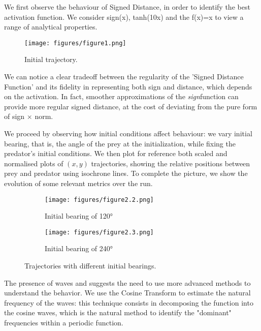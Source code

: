 \documentclass[11pt]{article}
\begin{document}
We first observe the behaviour of Signed Distance, in order to identify the best activation function. We consider sign(x), tanh(10x) and the f(x)=x to view a range of analytical properties.

\begin{figure}[htbp]
  \centering
  \texttt{[image: figures/figure1.png]}
  \caption{Initial trajectory.}
  \label{fig:trajectory}
\end{figure}

We can notice a clear tradeoff between the regularity of the 'Signed Distance Function' and its fidelity in representing both sign and distance, which depends on the activation. In fact, smoother approximations of the \textit{sign}function can provide more regular signed distance, at the cost of deviating from the pure form of sign $\times$ norm.

We proceed by observing how initial conditions affect behaviour: we vary initial bearing, that is, the angle of the prey at the initialization, while fixing the predator's initial conditions. We then plot for reference both scaled and normalised plots of $(x,y)$ trajectories, showing the relative positions between prey and predator using isochrone lines. To complete the picture, we show the evolution of some relevant metrics over the run.

\begin{figure}[htbp]
  \centering
  \begin{subfigure}[b]{0.48\textwidth}
    \centering
    \texttt{[image: figures/figure2.2.png]}
    \caption{Initial bearing of 120°}
    \label{fig:bear120}
  \end{subfigure}
  \hfill
  \begin{subfigure}[b]{0.48\textwidth}
    \centering
    \texttt{[image: figures/figure2.3.png]}
    \caption{Initial bearing of 240°}
    \label{fig:bear240}
  \end{subfigure}
  \caption{Trajectories with different initial bearings.}
  \label{fig:trajectories}
\end{figure}

The presence of waves and suggests the need to use more advanced methods to understand the behavior. We use the Cosine Transform to estimate the natural frequency of the waves: this technique consists in decomposing the function into the cosine waves, which is the natural method to identify the "dominant" frequencies within a periodic function.
\end{document}
